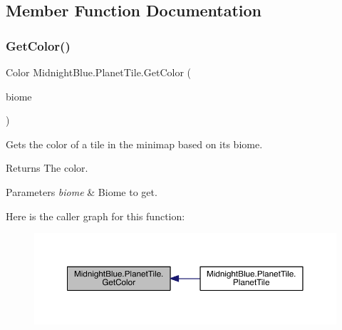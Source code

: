 \subsection{Member Function Documentation}
\hypertarget{class_midnight_blue_1_1_planet_tile_a0efc70f73aaf5a252cfe6b96deb9aa22}{}\label{class_midnight_blue_1_1_planet_tile_a0efc70f73aaf5a252cfe6b96deb9aa22} 
\subsubsection{\texorpdfstring{Get\+Color()}{GetColor()}}
{\footnotesize\ttfamily Color Midnight\+Blue.\+Planet\+Tile.\+Get\+Color (\begin{DoxyParamCaption}\item[{\hyperlink{namespace_midnight_blue_a8a6ba5637b64c3eb991f00d48decf381}{Biome}}]{biome }\end{DoxyParamCaption})\hspace{0.3cm}{\ttfamily [inline]}}



Gets the color of a tile in the minimap based on its biome. 

\begin{DoxyReturn}{Returns}
The color.
\end{DoxyReturn}

\begin{DoxyParams}{Parameters}
{\em biome} & Biome to get.\\
\hline
\end{DoxyParams}
Here is the caller graph for this function\+:\nopagebreak
\begin{figure}[H]
\begin{center}
\leavevmode
\includegraphics[width=350pt]{class_midnight_blue_1_1_planet_tile_a0efc70f73aaf5a252cfe6b96deb9aa22_icgraph}
\end{center}
\end{figure}
\hypertarget{class_midnight_blue_1_1_planet_tile_a0ba5d9886790e8f8d9e54e1873d5565b}{}\label{class_midnight_blue_1_1_planet_tile_a0ba5d9886790e8f8d9e54e1873d5565b} 
